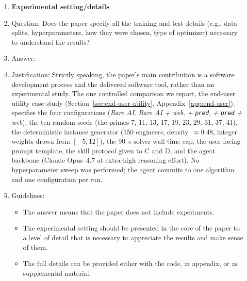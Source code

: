 \begin{enumerate}
\item {\bf Experimental setting/details}
    \item[] Question: Does the paper specify all the training and test details (e.g., data splits, hyperparameters, how they were chosen, type of optimizer) necessary to understand the results?
    \item[] Answer: \answerYes{}
    \item[] Justification: Strictly speaking, the paper's main contribution is a software development process and the delivered software tool, rather than an experimental study. The one controlled comparison we report, the end-user utility case study (Section~\ref{sec:end-user-utility}, Appendix~\ref{app:end-user}), specifies the four configurations (\emph{Bare AI}, \emph{Bare AI + web}, \emph{+ \texttt{pred}}, \emph{+ \texttt{pred} + web}), the ten random seeds (the primes 7, 11, 13, 17, 19, 23, 29, 31, 37, 41), the deterministic instance generator (150 engineers, density~$\approx 0.48$, integer weights drawn from $[-5, 12]$), the 90~s solver wall-time cap, the user-facing prompt template, the skill protocol given to C and D, and the agent backbone (Claude Opus~4.7 at extra-high reasoning effort). No hyperparameter sweep was performed; the agent commits to one algorithm and one configuration per run.
    \item[] Guidelines:
    \begin{itemize}
        \item The answer \answerNA{} means that the paper does not include experiments.
        \item The experimental setting should be presented in the core of the paper to a level of detail that is necessary to appreciate the results and make sense of them.
        \item The full details can be provided either with the code, in appendix, or as supplemental material.
    \end{itemize}


\end{enumerate}
